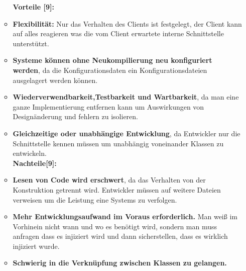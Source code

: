 \begin{enumerate}[(a)]
\begin{itemize}
        \textbf{Vorteile [9]:}
        \item \textbf{Flexibilität:} Nur das Verhalten des Clients ist festgelegt, der Client kann auf alles reagieren was die vom Client erwartete interne Schnittstelle unterstützt.
        \item \textbf{Systeme können ohne Neukompilierung neu konfiguriert werden}, da die Konfigurationsdaten ein Konfigurationsdateien ausgelagert werden können. 
        \item \textbf{Wiederverwendbarkeit,Testbarkeit und Wartbarkeit}, da man eine ganze Implementierung entfernen kann um Auswirkungen von Designänderung und fehlern zu isolieren.
        \item \textbf{Gleichzeitige oder unabhängige Entwicklung}, da Entwickler nur die Schnittstelle kennen müssen um unabhängig voneinander Klassen zu entwickeln.\\
        \textbf{Nachteile[9]:}
        \item \textbf{Lesen von Code wird erschwert}, da das Verhalten von der Konstruktion getrennt wird. Entwickler müssen auf weitere Dateien verweisen um die Leistung eine Systems zu verfolgen.
        \item \textbf{Mehr Entwicklungsaufwand im Voraus erforderlich.} Man weiß im Vorhinein nicht wann und wo es benötigt wird, sondern man muss anfragen dass es injiziert wird und dann sicherstellen, dass es wirklich injiziert wurde.
        \item \textbf{Schwierig in die Verknüpfung zwischen Klassen zu gelangen.}
    \end{itemize}
    
\end{enumerate}



